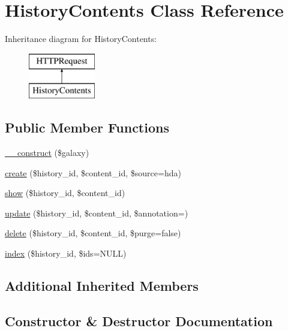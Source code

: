 \hypertarget{classHistoryContents}{}\section{History\+Contents Class Reference}
\label{classHistoryContents}
Inheritance diagram for History\+Contents\+:\begin{figure}[H]
\begin{center}
\leavevmode
\includegraphics[height=2.000000cm]{classHistoryContents}
\end{center}
\end{figure}
\subsection*{Public Member Functions}
\begin{DoxyCompactItemize}
\item 
\hyperlink{classHistoryContents_a3ea1e946ae6dbcb3d679e29154e69676}{\+\_\+\+\_\+construct} (\$galaxy)
\item 
\hyperlink{classHistoryContents_ac2e074468ce3b73a9463adec372ebe91}{create} (\$history\+\_\+id, \$content\+\_\+id, \$source=\textquotesingle{}hda\textquotesingle{})
\item 
\hyperlink{classHistoryContents_a5729d3c11cf8c8e3d317c802694ff633}{show} (\$history\+\_\+id, \$content\+\_\+id)
\item 
\hyperlink{classHistoryContents_aa38324b7aa0f92ae7ce26083fe8c2972}{update} (\$history\+\_\+id, \$content\+\_\+id, \$annotation=\textquotesingle{}\textquotesingle{})
\item 
\hyperlink{classHistoryContents_a53ffc8a65942b92724e248de38bdfe2b}{delete} (\$history\+\_\+id, \$content\+\_\+id, \$purge=false)
\item 
\hyperlink{classHistoryContents_aa8f0cc4cf1b594d6fc485b2f94a57b89}{index} (\$history\+\_\+id, \$ids=N\+U\+LL)
\end{DoxyCompactItemize}
\subsection*{Additional Inherited Members}


\subsection{Constructor \& Destructor Documentation}
